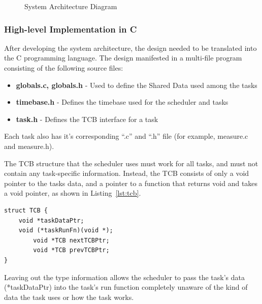 \documentclass[12pt]{article} %
\begin{document}
    \begin{figure}[h]
      \centering
      \caption{System Architecture Diagram}
      \label{fig:arch}
    \end{figure}

    \subsubsection{High-level Implementation in C}
    After developing the system architecture, the design needed to be translated into the C programming language. The design manifested in a multi-file program consisting of the following source files:
    \begin{itemize}
      \item \textbf{globals.c, globals.h} - Used to define the Shared Data used among the tasks
      \item \textbf{timebase.h} - Defines the timebase used for the scheduler and tasks
      \item \textbf{task.h} - Defines the TCB interface for a task
    \end{itemize}
    Each task also has it's corresponding ``.c'' and ``.h'' file (for example, measure.c and measure.h).

    The TCB structure that the scheduler uses must work for all tasks, and must
    not contain any task-specific information. Instead, the TCB consists of
    only a void pointer to the tasks data, and a pointer to a function that
    returns void and takes a void pointer, as shown in Listing~\ref{lst:tcb}.
	
\begin{lstlisting}[caption=TCB Construct, captionpos=b, label=lst:tcb]
struct TCB {
    void *taskDataPtr;
    void (*taskRunFn)(void *);
		void *TCB nextTCBPtr;
		void *TCB prevTCBPtr;
}
\end{lstlisting}
    Leaving out the type information allows the scheduler to pass the task's data
    (*taskDataPtr) into the task's run function completely unaware of the kind of
    data the task uses or how the task works.
\end{document}
